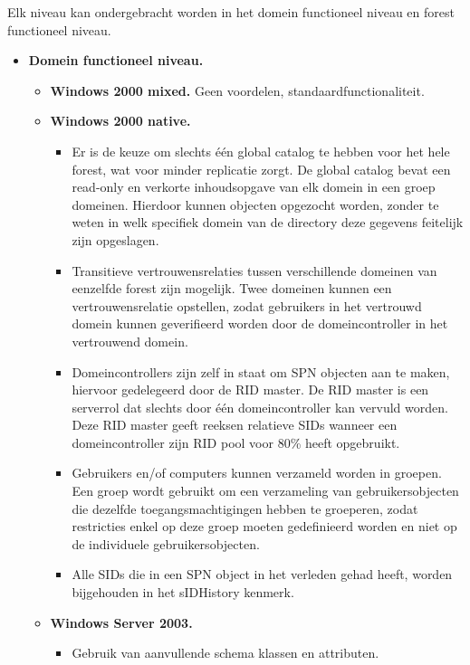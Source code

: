 \documentclass{report}
\begin{document}
\begin{enumerate}
{		}
		 {
			Elk niveau kan ondergebracht worden in het domein functioneel niveau en forest functioneel niveau.
			\begin{itemize}
				\item \textbf{Domein functioneel niveau.}
				\begin{itemize}
					\item \textbf{Windows 2000 mixed.} Geen voordelen, standaardfunctionaliteit.
					\item \textbf{Windows 2000 native.}
					\begin{itemize}
						\item Er is de keuze om slechts één global catalog te hebben voor het hele forest, wat voor minder replicatie zorgt. De global catalog bevat een read-only en verkorte inhoudsopgave van elk domein in een groep domeinen. Hierdoor kunnen objecten opgezocht worden, zonder te weten in welk specifiek domein van de directory deze gegevens feitelijk zijn opgeslagen.
						\item Transitieve vertrouwensrelaties tussen verschillende domeinen van eenzelfde forest zijn mogelijk. Twee domeinen kunnen een vertrouwensrelatie opstellen, zodat gebruikers in het vertrouwd domein kunnen geverifieerd worden door de domeincontroller in het vertrouwend domein. 
						\item Domeincontrollers zijn zelf in staat om SPN objecten aan te maken, hiervoor gedelegeerd door de RID master. De RID master is een serverrol dat slechts door één domeincontroller kan vervuld worden. Deze RID master geeft reeksen relatieve SIDs wanneer een domeincontroller zijn RID pool voor 80\% heeft opgebruikt.
						\item Gebruikers en/of computers kunnen verzameld worden in groepen. Een groep wordt gebruikt om een verzameling van gebruikersobjecten die dezelfde toegangsmachtigingen hebben te groeperen, zodat restricties enkel op deze groep moeten gedefinieerd worden en niet op de individuele gebruikersobjecten.
						\item Alle SIDs die in een SPN object in het verleden gehad heeft, worden bijgehouden in het sIDHistory kenmerk.
					\end{itemize}
					\item \textbf{Windows Server 2003.}
					\begin{itemize}
						\item Gebruik van aanvullende schema klassen en attributen.

\end{itemize}
\end{itemize}
\end{itemize}}
\end{enumerate}
\end{document}

